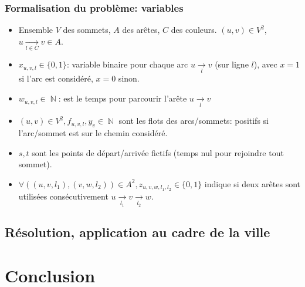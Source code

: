 \documentclass[10pt]{beamer}
\DeclareMathOperator{\NN}{\mathbb{N}}
\begin{document}
\begin{frame}
\frametitle{Formalisation du problème: variables}

\begin{itemize}
\item Ensemble $V$ des sommets, $A$ des arêtes, $C$ des couleurs.
$(u,v)\in V^2$, $u \xrightarrow[l\in C]{} v\in A$.

\item $x_{u,v,l}\in \lbrace 0,1 \rbrace$: variable binaire pour chaque arc $u \xrightarrow[l]{} v$ (sur ligne $l$), avec $x=1$ si l'arc est considéré, $x=0$ sinon.

\item $w_{u,v,l}\in \NN$: est le temps pour parcourir l'arête $u \xrightarrow[l]{} v$

\item $(u,v)\in V^2, f_{u,v,l}, y_v \in\NN$ sont les flots des arcs/sommets: positifs si l'arc/sommet est sur le chemin considéré.

\item $s, t$ sont les points de départ/arrivée fictifs (temps nul pour rejoindre tout sommet).
\item  $\forall ((u,v,l_1), (v,w,l_2)) \in A^2, z_{u,v,w,l_1,l_2} \in \lbrace 0,1 \rbrace$ indique si deux arêtes sont utilisées consécutivement $u \xrightarrow[l_1]{} v\xrightarrow[l_2]{} w$.
\end{itemize}
\end{frame}


\subsection{Résolution, application au cadre de la ville}



\section{Conclusion}
\end{document}
